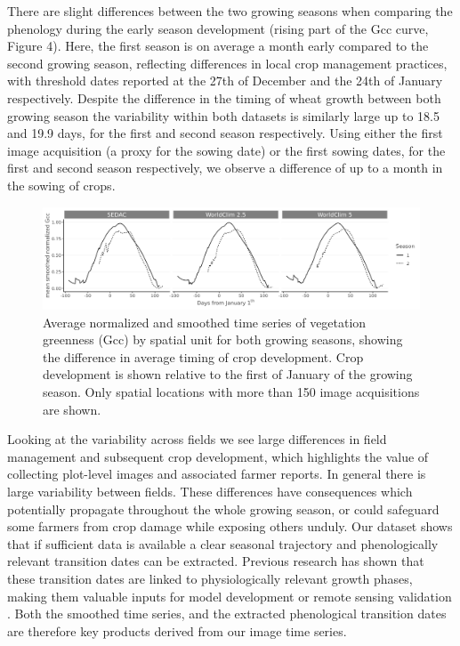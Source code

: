 \documentclass[, manuscript]{copernicus}
\begin{document}
There are slight differences between the two growing seasons when
comparing the phenology during the early season development (rising part
of the Gcc curve, Figure 4). Here, the first season is on average a
month early compared to the second growing season, reflecting
differences in local crop management practices, with threshold dates
reported at the 27th of December and the 24th of January respectively.
Despite the difference in the timing of wheat growth between both
growing season the variability within both datasets is similarly large
up to 18.5 and 19.9 days, for the first and second season respectively.
Using either the first image acquisition (a proxy for the sowing date)
or the first sowing dates, for the first and second season respectively,
we observe a difference of up to a month in the sowing of crops.

\begin{figure}
\includegraphics[width=1\linewidth]{./figures/summary_time_series_2} \caption{Average normalized and smoothed time series of vegetation greenness (Gcc) by spatial unit for both growing seasons, showing the difference in average timing of crop development. Crop development is shown relative to the first of January of the growing season. Only spatial locations with more than 150 image acquisitions are shown.}\label{fig:unnamed-chunk-5}
\end{figure}

Looking at the variability across fields we see large differences in
field management and subsequent crop development, which highlights the
value of collecting plot-level images and associated farmer reports. In
general there is large variability between fields. These differences
have consequences which potentially propagate throughout the whole
growing season, or could safeguard some farmers from crop damage while
exposing others unduly. Our dataset shows that if sufficient data is
available a clear seasonal trajectory and phenologically relevant
transition dates can be extracted. Previous research has shown that
these transition dates are linked to physiologically relevant growth
phases, making them valuable inputs for model development or remote
sensing validation \citep{hufkens2019}. Both the smoothed time series,
and the extracted phenological transition dates are therefore key
products derived from our image time series.
\end{document}

